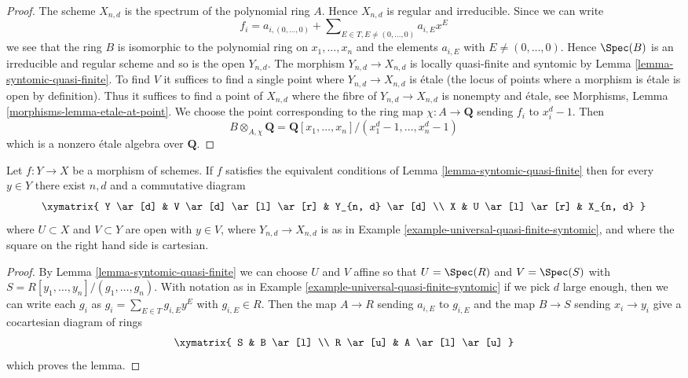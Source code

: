 \begin{proof}
The scheme $X_{n, d}$ is the spectrum of the polynomial ring $A$.
Hence $X_{n, d}$ is regular and irreducible. Since we can write
$$
f_i = a_{i, (0, \ldots, 0)} +
\sum\nolimits_{E \in T, E \not = (0, \ldots, 0)} a_{i, E} x^E
$$
we see that the ring $B$ is isomorphic to the polynomial ring
on $x_1, \ldots, x_n$ and the elements $a_{i, E}$ with
$E \not = (0, \ldots, 0)$. Hence $\Spec(B)$ is an irreducible and
regular scheme and so is the open $Y_{n, d}$. The morphism
$Y_{n, d} \to X_{n, d}$ is locally quasi-finite and syntomic by
Lemma \ref{lemma-syntomic-quasi-finite}. To find $V$ it suffices
to find a single point where $Y_{n, d} \to X_{n, d}$ is \'etale
(the locus of points where a morphism is \'etale is open by
definition). Thus it suffices to find a point of $X_{n, d}$
where the fibre of $Y_{n, d} \to X_{n, d}$ is nonempty and \'etale, see
Morphisms, Lemma \ref{morphisms-lemma-etale-at-point}. We choose
the point corresponding to the ring map $\chi : A \to \mathbf{Q}$
sending $f_i$ to $x_i^d - 1$. Then
$$
B \otimes_{A, \chi} \mathbf{Q} =
\mathbf{Q}[x_1, \ldots, x_n]/(x_1^d - 1, \ldots, x_n^d - 1)
$$
which is a nonzero \'etale algebra over $\mathbf{Q}$.
\end{proof}

\begin{lemma}
\label{lemma-locally-comes-from-universal}
Let $f : Y \to X$ be a morphism of schemes. If $f$ satisfies the equivalent
conditions of Lemma \ref{lemma-syntomic-quasi-finite} then for every
$y \in Y$ there exist $n, d$ and a commutative diagram
$$
\xymatrix{
Y \ar[d] &
V \ar[d] \ar[l] \ar[r] &
Y_{n, d} \ar[d] \\
X & U \ar[l] \ar[r] &
X_{n, d}
}
$$
where $U \subset X$ and $V \subset Y$ are open with $y \in V$,
where $Y_{n, d} \to X_{n, d}$
is as in Example \ref{example-universal-quasi-finite-syntomic}, and
where the square on the right hand side is cartesian.
\end{lemma}

\begin{proof}
By Lemma \ref{lemma-syntomic-quasi-finite}
we can choose $U$ and $V$ affine so that
$U = \Spec(R)$ and $V = \Spec(S)$ with
$S = R[y_1, \ldots, y_n]/(g_1, \ldots, g_n)$.
With notation as in Example \ref{example-universal-quasi-finite-syntomic}
if we pick $d$ large enough, then we can write each $g_i$ as
$g_i = \sum_{E \in T} g_{i, E}y^E$ with $g_{i, E} \in R$.
Then the map $A \to R$ sending $a_{i, E}$ to $g_{i, E}$
and the map $B \to S$ sending $x_i \to y_i$ give a cocartesian
diagram of rings
$$
\xymatrix{
S & B \ar[l] \\
R \ar[u] & A \ar[l] \ar[u]
}
$$
which proves the lemma.
\end{proof}











